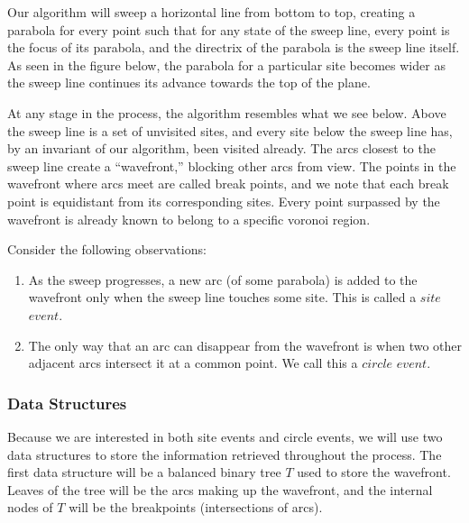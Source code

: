 Our algorithm will sweep a horizontal line from bottom to top, creating
a parabola for every point such that for any state of the sweep line, 
every point is the focus of its parabola, and the directrix of the parabola 
is the sweep line itself.  As seen in the figure below, the parabola for a 
particular site becomes wider as the sweep line continues its advance 
towards the top of the plane.


\begin{center}
\end{center}


At any stage in the process, the algorithm resembles what we see below.
Above the sweep line is a set of unvisited sites, and every site below
the sweep line has, by an invariant of our algorithm, been visited already.  
The arcs closest to the sweep line create a ``wavefront,'' blocking other arcs
from view.  The points in the wavefront where arcs meet are called
break points, and we note that each break point is equidistant from its 
corresponding sites.  Every point surpassed by the wavefront is already known
to belong to a specific voronoi region.

\begin{center}
\end{center}


Consider the following observations:
\begin{enumerate}
\item As the sweep progresses, a new arc (of some parabola) is added to the
wavefront only when the sweep line touches some site.  This is called a 
$site$ $event$.

\item The only way that an arc can disappear from the wavefront is when two 
other adjacent arcs intersect it at a common point.  We call this a 
$circle$ $event$.
\end{enumerate}


\subsubsection{Data Structures}
Because we are interested in both site events and circle events, we will use
two data structures to store the information retrieved throughout the process.
The first data structure will be a balanced binary tree $T$ used to store
the wavefront.  Leaves of the tree will be the arcs making up the wavefront,
and the internal nodes of $T$ will be the breakpoints (intersections of arcs).


